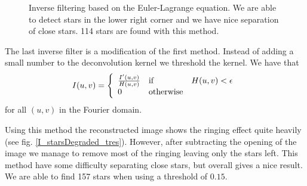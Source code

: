 \documentclass[a4paper, 10pt, final]{article}
\begin{document}
\begin{figure}[!h]
    \caption[]{Inverse filtering based on the Euler-Lagrange equation.
    We are able to detect stars in the lower right corner and we have
    nice separation of close stars. 114 stars are found with this
    method.}
    \label{countstars_taylor}
\end{figure}

The last inverse filter is a modification of the first method. Instead
of adding a small number to the deconvolution kernel we threshold the
kernel. We have that
\begin{equation}
    I(u,v) = \left\{ \begin{array}{l l l}
        \frac{I'(u,v)}{H(u,v)} & \mbox{if} & H(u, v) < \epsilon\\
        0 & \mbox{otherwise} &
    \end{array}\right.
\end{equation}
for all $(u,v)$ in the Fourier domain.

Using this method the reconstructed image shows the ringing effect quite
heavily (see fig. \ref{I_starsDegraded_tres}). However, after
subtracting the opening of the image we manage to remove most of the
ringing leaving only the stars left. This method have some difficulty
separating close stars, but overall gives a nice result. We are able to
find 157 stars when using a threshold of $0.15$.
\end{document}
